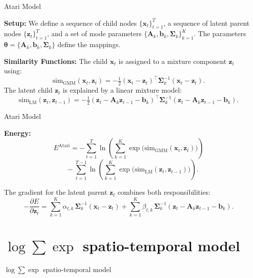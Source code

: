 \documentclass{beamer}
\begin{document}
    
\begin{frame}{Atari Model}

    \textbf{Setup:}  
    We define a sequence of child nodes \(\{\bm{x}_t\}_{t=1}^T\), a sequence of latent parent nodes \(\{\bm{z}_t\}_{t=1}^T\), and a set of mode parameters \(\{\bm{A}_k, \bm{b}_k, \bm{\Sigma}_k\}_{k=1}^K\). The parameters \(\bm{\theta} = \{\bm{A}_k, \bm{b}_k, \bm{\Sigma}_k\}\) define the mappings.

    \bigskip
    
    \textbf{Similarity Functions:}  
    The child \(\bm{x}_t\) is assigned to a mixture component \(\bm{z}_t\) using:
    \[
    \mathrm{sim}_{\text{GMM}}(\bm{x}_t, \bm{z}_t)
    =
    -\tfrac{1}{2} (\bm{x}_t - \bm{z}_t)^\top \bm{\Sigma}_k^{-1} (\bm{x}_t - \bm{z}_t).
    \]
    The latent child \(\bm{z}_{t}\) is explained by a linear mixture model:
    \[
    \mathrm{sim}_{\text{LM}}(\bm{z}_t, \bm{z}_{t-1})
    =
    -\tfrac{1}{2} (\bm{z}_t - \bm{A}_k \bm{z}_{t-1} - \bm{b}_k)^\top \bm{\Sigma}_k^{-1} (\bm{z}_t - \bm{A}_k \bm{z}_{t-1} - \bm{b}_k).
    \]

\end{frame}

\begin{frame}{Atari Model}

    \textbf{Energy:}  
    \[
    E^{\mathrm{Atari}}
    = -\sum_{t=1}^{T} 
    \ln \left(
    \sum_{k=1}^K \exp\bigl(\mathrm{sim}_{\text{GMM}}(\bm{x}_t, \bm{z}_t)\bigr)
    \right)
    \]
    \[
    \quad -\sum_{t=1}^{T-1} 
    \ln \left(
    \sum_{k=1}^K \exp\bigl(\mathrm{sim}_{\text{LM}}(\bm{z}_t, \bm{z}_{t-1})\bigr)
    \right).
    \]

    The gradient for the latent parent \(\bm{z}_t\) combines both responsibilities:
    \[
    -\frac{\partial E}{\partial \bm{z}_t}
    =
    \sum_{k=1}^K \alpha_{t,k} \,\bm{\Sigma}_k^{-1} (\bm{x}_t - \bm{z}_t)
    + \sum_{k=1}^K \beta_{t,k} \,\bm{\Sigma}_k^{-1} (\bm{z}_t - \bm{A}_k \bm{z}_{t-1} - \bm{b}_k).
    \]

\end{frame}
    

\section{$\log \sum \exp$ spatio-temporal model}
\begin{frame}
    \centering
    \Huge $\log \sum \exp$ spatio-temporal model
\end{frame}
\end{document}
